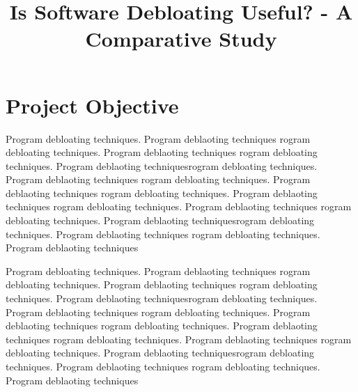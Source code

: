 \documentclass{relatorio}
\title{Is Software Debloating Useful? - A Comparative Study}
\begin{document}
	
	\onecolumn
	\tableofcontents
	\twocolumn  
	
	\maketitle{}

\section{Project Objective}%
\label{Tools}

Program debloating techniques. Program deblaoting techniques rogram debloating techniques. Program deblaoting techniques
rogram debloating techniques. Program deblaoting techniquesrogram debloating techniques. Program deblaoting techniques
rogram debloating techniques. Program deblaoting techniques rogram debloating techniques. Program deblaoting techniques
rogram debloating techniques. Program deblaoting techniques 
rogram debloating techniques. Program deblaoting techniquesrogram debloating techniques. Program deblaoting techniques
rogram debloating techniques. Program deblaoting techniques

Program debloating techniques. Program deblaoting techniques rogram debloating techniques. Program deblaoting techniques
rogram debloating techniques. Program deblaoting techniquesrogram debloating techniques. Program deblaoting techniques
rogram debloating techniques. Program deblaoting techniques rogram debloating techniques. Program deblaoting techniques
rogram debloating techniques. Program deblaoting techniques 
rogram debloating techniques. Program deblaoting techniquesrogram debloating techniques. Program deblaoting techniques
rogram debloating techniques. Program deblaoting techniques
\end{document}
